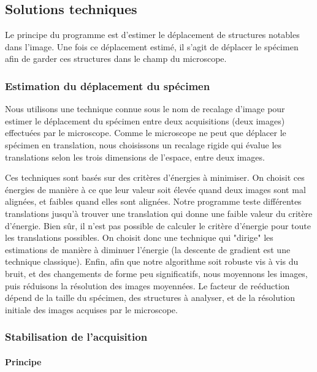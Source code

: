 \subsection{Solutions techniques}

Le principe du programme est d'estimer le déplacement de structures notables dans l'image.
Une fois ce déplacement estimé, il s'agit de déplacer le spécimen afin de garder ces structures dans le champ du microscope.

\subsubsection{Estimation du déplacement du spécimen}
Nous utilisons une technique connue sous le nom de recalage d'image pour estimer le déplacement du spécimen entre deux acquisitions (deux images) effectuées par le microscope.
Comme le microscope ne peut que déplacer le spécimen en translation, nous choisissons un recalage rigide qui évalue les translations selon les trois dimensions de l'espace, entre deux images.

Ces techniques sont basés sur des critères d'énergies à minimiser.
On choisit ces énergies de manière à ce que leur valeur soit élevée quand deux images sont mal alignées,
et faibles quand elles sont alignées. Notre programme teste différentes translations jusqu'à trouver une translation
qui donne une faible valeur du critère d'énergie.
Bien sûr, il n'est pas possible de calculer le critère d'énergie pour toute les translations possibles.
On choisit donc une technique qui "dirige" les estimations de manière à diminuer l'énergie (la descente de gradient est une technique classique).
Enfin, afin que notre algorithme soit robuste vis à vis du bruit, et des changements de forme peu significatifs,
nous moyennons les images, puis réduisons la résolution des images moyennées. Le facteur de reéduction dépend de la taille du spécimen, des structures à analyser, et de la résolution initiale des images acquises par le microscope.



\subsubsection{Stabilisation de l'acquisition}

\paragraph{Principe}


